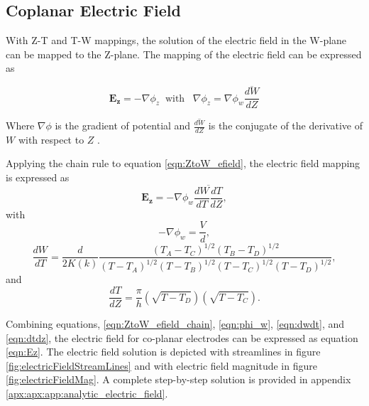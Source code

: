 \subsection{Coplanar Electric Field}

 \par With Z-T and T-W mappings, the solution of the electric field in the W-plane can be mapped to the Z-plane. The mapping of the electric field can be expressed as 
 
 \begin{equation}
     \boldsymbol{E_z} = -\nabla \phi_z \;\;\text{with} \;\;\;\nabla \phi_z = \nabla \phi_w \overline{\frac{dW}{dZ}}
     \label{eqn:ZtoW_efield}
 \end{equation}
 
 \noindent Where $\nabla \phi$ is the gradient of potential and $\overline{\frac{dW}{dZ}}$ is the conjugate of the derivative of $W$ with respect to $Z$ \cite{schinzinger_conformal_2012}.
 
 \par Applying the chain rule to equation \ref{eqn:ZtoW_efield}, the electric field mapping is expressed as
 \begin{equation}
    \boldsymbol{E_z} =- \nabla \phi_w \overline{\frac{dW}{dT}\frac{dT}{dZ}},
    \label{eqn:ZtoW_efield_chain}
 \end{equation}
\noindent with 
 \begin{equation}
     -\nabla \phi_w = \frac{V}{d},
     \label{eqn:phi_w}
 \end{equation}
 \begin{equation}
     \frac{dW}{dT} = \frac{d}{2K(k)}\frac{(T_A - T_C)^{1/2}(T_B-T_D)^{1/2}}{(T-T_A)^{1/2}(T-T_B)^{1/2}(T-T_C)^{1/2}(T-T_D)^{1/2}},
     \label{eqn:dwdt}
 \end{equation}
 \noindent and
 \begin{equation}
     \frac{dT}{dZ} = \frac{\pi}{h}(\sqrt{T-T_D})(\sqrt{T-T_C}).
     \label{eqn:dtdz}
 \end{equation}
 
 \par Combining equations, \ref{eqn:ZtoW_efield_chain}, \ref{eqn:phi_w}, \ref{eqn:dwdt}, and \ref{eqn:dtdz}, the electric field for co-planar electrodes can be expressed as equation \ref{eqn:Ez}. The electric field solution is depicted with streamlines in figure \ref{fig:electricFieldStreamLines} and with electric field magnitude in figure \ref{fig:electricFieldMag}. A complete step-by-step solution is provided in appendix \ref{apx:apx:app:analytic_electric_field}.
 

